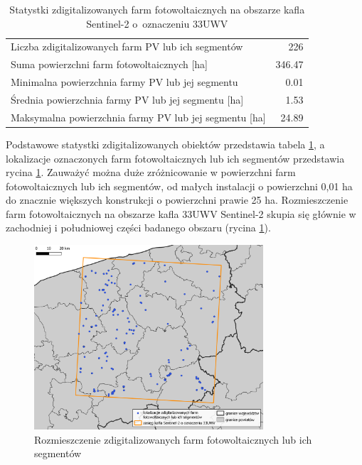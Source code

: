 \documentclass{amuthesis}
\begin{document}
\hypertarget{tbl-tabela-digitizing-results}{}
\begin{table}
\caption{\label{tbl-tabela-digitizing-results}Statystki zdigitalizowanych farm fotowoltaicznych na obszarze kafla
Sentinel-2 o~oznaczeniu 33UWV }\tabularnewline

\centering
\begin{tabular}{lr}
\toprule
Liczba zdigitalizowanych farm PV lub ich segmentów & 226\\
Suma powierzchni farm fotowoltaicznych [ha] & 346.47\\
Minimalna powierzchnia farmy PV lub jej segmentu & 0.01\\
Średnia powierzchnia farmy PV lub jej segmentu [ha] & 1.53\\
Maksymalna powierzchnia farmy PV lub jej segmentu [ha] & 24.89\\
\bottomrule
\end{tabular}
\end{table}

Podstawowe statystki zdigitalizowanych obiektów przedstawia tabela
\ref{tbl-tabela-digitizing-results}, a lokalizacje oznaczonych farm
fotowoltaicznych lub ich segmentów przedstawia rycina
\ref{fig-rycina-spatial-distribution-pv}. Zauważyć można duże
zróżnicowanie w powierzchni farm fotowoltaicznych lub ich segmentów, od
małych instalacji o powierzchni 0,01 ha do znacznie większych
konstrukcji o powierzchni prawie 25 ha. Rozmieszczenie farm
fotowoltaicznych na obszarze kafla 33UWV Sentinel-2 skupia się głównie w
zachodniej i południowej części badanego obszaru (rycina
\ref{fig-rycina-spatial-distribution-pv}).

\begin{figure}[H]

{\centering \includegraphics[width=0.76\textwidth,height=\textheight]{figures/farmy2.png}

}

\caption{\label{fig-rycina-spatial-distribution-pv}Rozmieszczenie
zdigitalizowanych farm fotowoltaicznych lub ich segmentów}

\end{figure}
\end{document}
